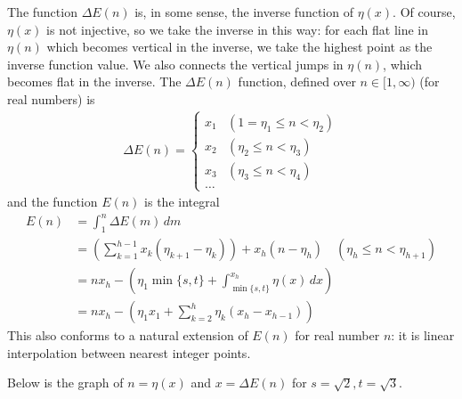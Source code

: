 \documentclass[]{article}
\begin{document}
The function $\Delta E(n)$ is, in some sense, the inverse function of $\eta(x)$. Of course, $\eta(x)$ is not injective, so we take the inverse in this way: for each flat line in $\eta(n)$ which becomes vertical in the inverse, we take the highest point as the inverse function value. We also connects the vertical jumps in $\eta(n)$, which becomes flat in the inverse. The $\Delta E(n)$ function, defined over $n \in [1, \infty)$ (for real numbers) is
\begin{align*}
\Delta E(n) = \begin{cases}
x_1 & (1 = \eta_1 \le n < \eta_2) \\
x_2 & (\eta_2 \le n < \eta_3) \\
x_3 & (\eta_3 \le n < \eta_4) \\
\dots
\end{cases}
\end{align*}
and the function $E(n)$ is the integral
\begin{align*}
E(n) &= \int_1^n \Delta E(m)\, dm \\
 &= \left(\sum_{k = 1}^{h-1} x_k (\eta_{k+1} - \eta_k)\right) + x_{h} (n - \eta_{h}) \quad (\eta_{h} \le n < \eta_{h+1}) \\
 &= n x_h - \left(\eta_1 \min\{s, t\} + \int_{\min\{s, t\}}^{x_h} \eta(x)\, dx\right)\\
 &= n x_h  - \left(\eta_1 x_1 + \sum_{k=2}^{h} \eta_k (x_{h} - x_{h-1})\right)
\end{align*}
This also conforms to a natural extension of $E(n)$ for real number $n$: it is linear interpolation between nearest integer points.

Below is the graph of $n = \eta(x)$ and $x = \Delta E(n)$ for $s = \sqrt{2}, t = \sqrt{3}$.
\end{document}
